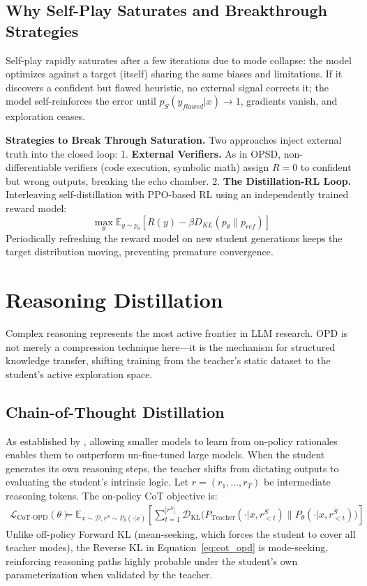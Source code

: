 \documentclass{article} %
\begin{document}
\subsection{Why Self-Play Saturates and Breakthrough Strategies}
\label{subsec:saturation_analysis}

Self-play rapidly saturates after a few iterations due to mode collapse: the model optimizes against a target (itself) sharing the same biases and limitations. If it discovers a confident but flawed heuristic, no external signal corrects it; the model self-reinforces the error until $p_S(y_{flawed}|x) \to 1$, gradients vanish, and exploration ceases.

\textbf{Strategies to Break Through Saturation.} Two approaches inject external truth into the closed loop:
1. \textbf{External Verifiers.} As in OPSD, non-differentiable verifiers (code execution, symbolic math) assign $R=0$ to confident but wrong outputs, breaking the echo chamber.
2. \textbf{The Distillation-RL Loop.} Interleaving self-distillation with PPO-based RL using an independently trained reward model:
\begin{equation}
    \max_\theta \mathbb{E}_{y \sim p_\theta} \left[ R(y) - \beta D_{KL}(p_\theta \parallel p_{ref}) \right]
\end{equation}
Periodically refreshing the reward model on new student generations keeps the target distribution moving, preventing premature convergence.


\section{Reasoning Distillation}
\label{sec:reasoning}

Complex reasoning represents the most active frontier in LLM research. OPD is not merely a compression technique here---it is the mechanism for structured knowledge transfer, shifting training from the teacher's static dataset to the student's active exploration space.

\subsection{Chain-of-Thought Distillation}
As established by \citet{2305.02301}, allowing smaller models to learn from on-policy rationales enables them to outperform un-fine-tuned large models. When the student generates its own reasoning steps, the teacher shifts from dictating outputs to evaluating the student's intrinsic logic. Let $r = (r_1, \dots, r_T)$ be intermediate reasoning tokens. The on-policy CoT objective is:
\begin{align}
\mathcal{L}_{\text{CoT-OPD}}(\theta) &= \mathbb{E}_{x \sim \mathcal{D}, r^S \sim P_\theta(\cdot|x)} \left[ \sum_{t=1}^{|r^S|} \mathcal{D}_{\text{KL}} \Big( P_{\text{Teacher}}(\cdot | x, r^S_{<t}) \parallel P_\theta(\cdot | x, r^S_{<t}) \Big) \right] \label{eq:cot_opd}
\end{align}
Unlike off-policy Forward KL (mean-seeking, which forces the student to cover all teacher modes), the Reverse KL in Equation~\ref{eq:cot_opd} is mode-seeking, reinforcing reasoning paths highly probable under the student's own parameterization when validated by the teacher.
\end{document}
